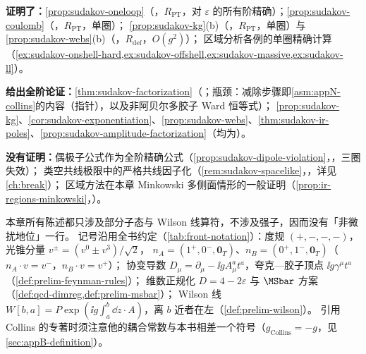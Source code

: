 \begin{tcolorbox}[enhanced,breakable,title=本章证明了什么／没有证明什么,fonttitle=\bfseries,
  colback=gray!3!white,colframe=gray!55!black,boxrule=0.6pt,arc=2pt,
  left=5pt,right=5pt,top=3pt,bottom=3pt,before skip=6pt,after skip=6pt]
\textbf{证明了：}\cref{prop:sudakov-oneloop}（\tagR，$R_{\mathrm{PT}}$，对 $\varepsilon$ 的所有阶精确）；\cref{prop:sudakov-coulomb}（\tagR，$R_{\mathrm{PT}}$，单圈）；
\cref{prop:sudakov-kg}(b)（\tagR，$R_{\mathrm{PT}}$，单圈）与\cref{prop:sudakov-webs}(b)（\tagR，$R_{\mathrm{def}}$，$O(g^2)$）；
区域分析各例的单圈精确计算（\cref{ex:sudakov-onshell-hard,ex:sudakov-offshell,ex:sudakov-massive,ex:sudakov-ll}）。\par
\textbf{给出全阶论证：}\cref{thm:sudakov-factorization}（\tagA；瓶颈：减除步骤即\cref{asm:appN-collins}的内容（指针），以及非阿贝尔多胶子 Ward 恒等式）；
\cref{prop:sudakov-kg}、\cref{cor:sudakov-exponentiation}、\cref{prop:sudakov-webs}、\cref{thm:sudakov-ir-poles}、\cref{prop:sudakov-amplitude-factorization}（均为\tagA）。\par
\textbf{没有证明：}偶极子公式作为全阶精确公式（\cref{prop:sudakov-dipole-violation}，\tagV，三圈失效）；
类空共线极限中的严格共线因子化（\cref{rem:sudakov-spacelike}，\tagV，详见\cref{ch:break}）；
区域方法在本章 Minkowski 多侧面情形的一般证明（\cref{prop:ir-regions-minkowski}，\tagP）。
\end{tcolorbox}

本章所有陈述都只涉及部分子态与 Wilson 线算符，不涉及强子，因而没有「非微扰地位」一行。
记号沿用全书约定（\cref{tab:front-notation}）：度规 $(+,-,-,-)$，光锥分量 $v^\pm=(v^0\pm v^3)/\sqrt2$，
$n_A=(1^+,0^-,\mathbf 0_T)$、$n_B=(0^+,1^-,\mathbf 0_T)$（$n_A\cdot v=v^-$，$n_B\cdot v=v^+$）；
协变导数 $D_\mu=\partial_\mu-\ii gA^a_\mu t^a$，夸克—胶子顶点 $\ii g\gamma^\mu t^a$（\cref{def:prelim-feynman-rules}）；
维数正规化 $D=4-2\varepsilon$ 与 $\MSbar$ 方案（\cref{def:qcd-dimreg,def:prelim-msbar}）；
Wilson 线 $W[b,a]=P\exp(\ii g\int_a^b\dd z\cdot A)$，离 $b$ 近者在左（\cref{def:prelim-wilson}）。
引用 Collins 的专著\cite{Collins2011}时须注意他的耦合常数与本书相差一个符号（$g_{\mathrm{Collins}}=-g$，见\cref{sec:appB-definition}）。
